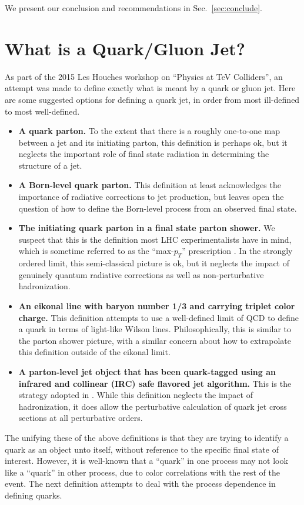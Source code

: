 \documentclass[11pt,letterpaper]{article}
\DeclareRobustCommand{\Sec}[1]{Sec.~\ref{#1}}
\begin{document}
We present our conclusion and recommendations in \Sec{sec:conclude}.

\section{What is a Quark/Gluon Jet?}
\label{sec:quarkgluondef}

As part of the 2015 Les Houches workshop on ``Physics at TeV Colliders'', an attempt was made to define exactly what is meant by a quark or gluon jet.  Here are some suggested options for defining a quark jet, in order from most ill-defined to most well-defined.
\begin{itemize}
\item \textbf{A quark parton.}  To the extent that there is a roughly one-to-one map between a jet and its initiating parton, this definition is perhaps ok, but it neglects the important role of final state radiation in determining the structure of a jet.
\item \textbf{A Born-level quark parton.}  This definition at least acknowledges the importance of radiative corrections to jet production, but leaves open the question of how to define the Born-level process from an observed final state. 
\item \textbf{The initiating quark parton in a final state parton shower.}  We suspect that this is the definition most LHC experimentalists have in mind, which is sometime referred to as the ``max-$p_T$'' prescription \cite{}.  In the strongly ordered limit, this semi-classical picture is ok, but it neglects the impact of genuinely quantum radiative corrections as well as non-perturbative hadronization. 
\item \textbf{An eikonal line with baryon number 1/3 and carrying triplet color charge.}  This definition attempts to use a well-defined limit of QCD to define a quark in terms of light-like Wilson lines.  Philosophically, this is similar to the parton shower picture, with a similar concern about how to extrapolate this definition outside of the eikonal limit.
\item \textbf{A parton-level jet object that has been quark-tagged using an infrared and collinear (IRC) safe flavored jet algorithm.}  This is the strategy adopted in \cite{}.  While this definition neglects the impact of hadronization, it does allow the perturbative calculation of quark jet cross sections at all perturbative orders.
\end{itemize}
The unifying these of the above definitions is that they are trying to identify a quark as an object unto itself, without reference to the specific final state of interest.  However, it is well-known that a ``quark'' in one process may not look like a ``quark'' in other process, due to color correlations with the rest of the event.  The next definition attempts to deal with the process dependence in defining quarks. 
\end{document}
